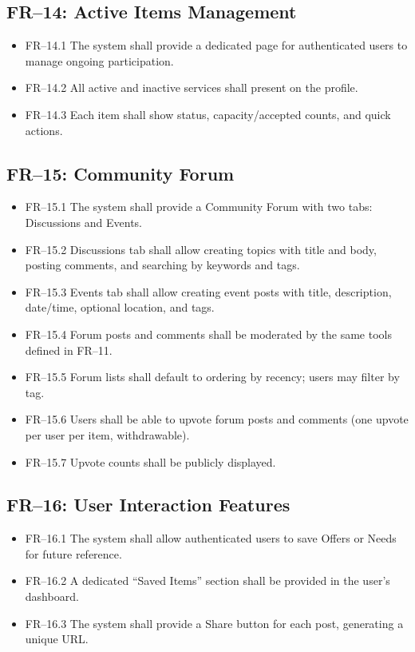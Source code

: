 \documentclass[10pt,a4paper]{report}
\begin{document}
\subsection{FR--14: Active Items Management}
\begin{itemize}
    \item FR--14.1 The system shall provide a dedicated page for authenticated users to manage ongoing participation.
    \item FR--14.2 All active and inactive services shall present on the profile.
    \item FR--14.3 Each item shall show status, capacity/accepted counts, and quick actions.
\end{itemize}

\subsection{FR--15: Community Forum}
\begin{itemize}
    \item FR--15.1 The system shall provide a Community Forum with two tabs: Discussions and Events.
    \item FR--15.2 Discussions tab shall allow creating topics with title and body, posting comments, and searching by keywords and tags.
    \item FR--15.3 Events tab shall allow creating event posts with title, description, date/time, optional location, and tags.
    \item FR--15.4 Forum posts and comments shall be moderated by the same tools defined in FR--11.
    \item FR--15.5 Forum lists shall default to ordering by recency; users may filter by tag.
    \item FR--15.6 Users shall be able to upvote forum posts and comments (one upvote per user per item, withdrawable).
    \item FR--15.7 Upvote counts shall be publicly displayed.
\end{itemize}

\subsection{FR--16: User Interaction Features}
\begin{itemize}
    \item FR--16.1 The system shall allow authenticated users to save Offers or Needs for future reference.
    \item FR--16.2 A dedicated ``Saved Items'' section shall be provided in the user's dashboard.
    \item FR--16.3 The system shall provide a Share button for each post, generating a unique URL.
\end{itemize}
\end{document}
